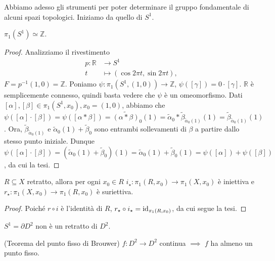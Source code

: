 Abbiamo adesso gli strumenti per poter determinare il gruppo fondamentale di alcuni spazi topologici. Iniziamo da quello di $S^1$.

\begin{thm}
  $\pi_1(S^1) \simeq \mathbb{Z}$.
\end{thm}

\begin{proof}
  Analizziamo il rivestimento
  \begin{align*}
    p: \mathbb{R} &\longrightarrow S^1 \\
    t &\longmapsto (\cos{2\pi t}, \sin{2\pi t}),
  \end{align*}
  $F=p^{-1}(1, 0)=\mathbb{Z}$. Poniamo $\psi:\pi_1(S^1, (1, 0)) \rightarrow \mathbb{Z}$, $\psi([\gamma])=0 \cdot [\gamma]$. $\mathbb{R}$ è semplicemente connesso, quindi basta vedere che $\psi$ è un omeomorfismo.
  Dati $[\alpha], [\beta] \in \pi_1(S^1, x_0), x_0=(1, 0)$,
  abbiamo che $\psi([\alpha] \cdot [\beta])=\psi([\alpha * \beta])=\widetilde{(\alpha * \beta)}_0(1)=\tilde{\alpha}_0*\tilde{\beta}_{\tilde{\alpha}_0(1)}(1)=\tilde{\beta}_{\tilde{\alpha}_0(1)}(1)$.
  Ora, $\tilde{\beta}_{\tilde{\alpha}_0(1)}$ e $\tilde{\alpha}_0(1)+\tilde{\beta}_0$ sono entrambi sollevamenti di $\beta$ a partire dallo stesso punto iniziale.
  Dunque $\psi([\alpha] \cdot [\beta])=(\tilde{\alpha}_0(1)+\tilde{\beta}_0)(1)=\tilde{\alpha}_0(1)+\tilde{\beta}_0(1)=\psi([\alpha])+\psi([\beta])$, da cui la tesi.
\end{proof}

\begin{prop}
  $R \subseteq X$ retratto, allora per ogni $x_0 \in R$ $i_{\star}: \pi_1(R, x_0) \rightarrow \pi_1(X, x_0)$ è iniettiva e $r_{\star}: \pi_1(X, x_0) \rightarrow \pi_1(R, x_0)$ è suriettiva.
\end{prop}

\begin{proof}
  Poiché $r \circ i$ è l'identità di $R$, $r_{\star} \circ i_{\star}=\operatorname{id}_{\pi_1(R, x_0)}$, da cui segue la tesi.
\end{proof}

\begin{cor}
  $S^1=\partial D^2$ non è un retratto di $D^2$.
\end{cor}

\begin{thm}
  (Teorema del punto fisso di Brouwer) $f:D^2 \rightarrow D^2$ continua $\implies$ $f$ ha almeno un punto fisso.
\end{thm}

